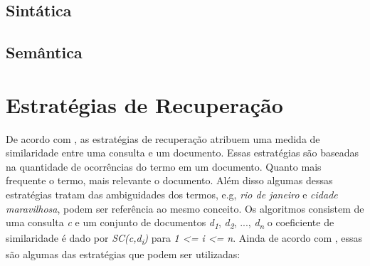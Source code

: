 \subsection{Sintática}
\subsection{Semântica}

\section{Estratégias de Recuperação}

De acordo com \cite{Grossman2004}, as estratégias de recuperação atribuem uma medida de similaridade entre uma consulta e um documento. Essas estratégias são baseadas na quantidade de ocorrências do termo em um documento. Quanto mais frequente o termo, mais relevante o documento. Além disso algumas dessas estratégias tratam das ambiguidades dos termos, e.g, \textit{rio de janeiro} e \textit{cidade maravilhosa}, podem ser referência ao mesmo conceito.
Os algoritmos consistem de uma consulta \textit{c} e um conjunto de documentos \textit{d\textsubscript{1}}, \textit{d\textsubscript{2}}, ..., \textit{d\textsubscript{n}} o coeficiente de similaridade é dado por \textit{SC(c,d\textsubscript{i})} para \textit{1 <= i <= n}.
Ainda de acordo com \cite{Grossman2004}, essas são algumas das estratégias que podem ser utilizadas:

